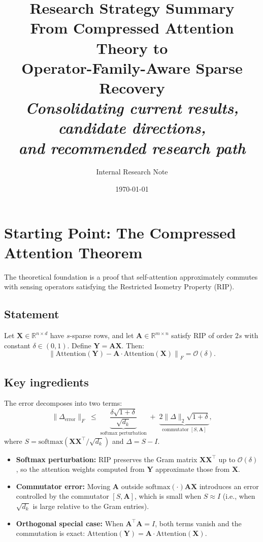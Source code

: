 \documentclass[11pt]{article}
\title{\textbf{Research Strategy Summary}\\[0.3em]
\large From Compressed Attention Theory to\\
Operator-Family-Aware Sparse Recovery\\[0.5em]
\normalsize \textit{Consolidating current results, candidate directions,\\
and recommended research path}}
\author{Internal Research Note}
\date{\today}
\newcommand{\A}{\mathbf{A}}
\newcommand{\X}{\mathbf{X}}
\newcommand{\Y}{\mathbf{Y}}
\begin{document}
\maketitle
\tableofcontents
\newpage

\section{Starting Point: The Compressed Attention Theorem}
\label{sec:theorem}

The theoretical foundation is a proof that self-attention approximately
commutes with sensing operators satisfying the Restricted Isometry
Property (RIP).

\subsection{Statement}

Let $\X \in \mathbb{R}^{n \times d}$ have $s$-sparse rows, and let
$\A \in \mathbb{R}^{m \times n}$ satisfy RIP of order $2s$ with
constant $\delta \in (0,1)$. Define $\Y = \A\X$. Then:
\begin{equation}
\left\| \mathrm{Attention}(\Y)
      - \A \cdot \mathrm{Attention}(\X) \right\|_F
= \mathcal{O}(\delta).
\label{eq:commutation}
\end{equation}

\subsection{Key ingredients}

The error decomposes into two terms:
\begin{equation}
\|\Delta_{\mathrm{error}}\|_F
\;\leq\;
\underbrace{\frac{\delta\sqrt{1+\delta}}{\sqrt{d_k}}}_{\text{softmax perturbation}}
\;+\;
\underbrace{2\|\Delta\|_2 \sqrt{1+\delta}}_{\text{commutator } [S, \A]},
\end{equation}
where $S = \mathrm{softmax}(\X\X^\top / \sqrt{d_k})$ and
$\Delta = S - I$.

\begin{itemize}[leftmargin=2em]
    \item \textbf{Softmax perturbation:} RIP preserves the Gram matrix
    $\X\X^\top$ up to $\mathcal{O}(\delta)$, so the attention weights
    computed from $\Y$ approximate those from $\X$.
    \item \textbf{Commutator error:} Moving $\A$ outside
    $\mathrm{softmax}(\cdot)\A\X$ introduces an error controlled by
    the commutator $[S, \A]$, which is small when $S \approx I$
    (i.e., when $\sqrt{d_k}$ is large relative to the Gram entries).
    \item \textbf{Orthogonal special case:} When $\A^\top\A = I$,
    both terms vanish and the commutation is exact:
    $\mathrm{Attention}(\Y) = \A \cdot \mathrm{Attention}(\X)$.
\end{itemize}
\end{document}
